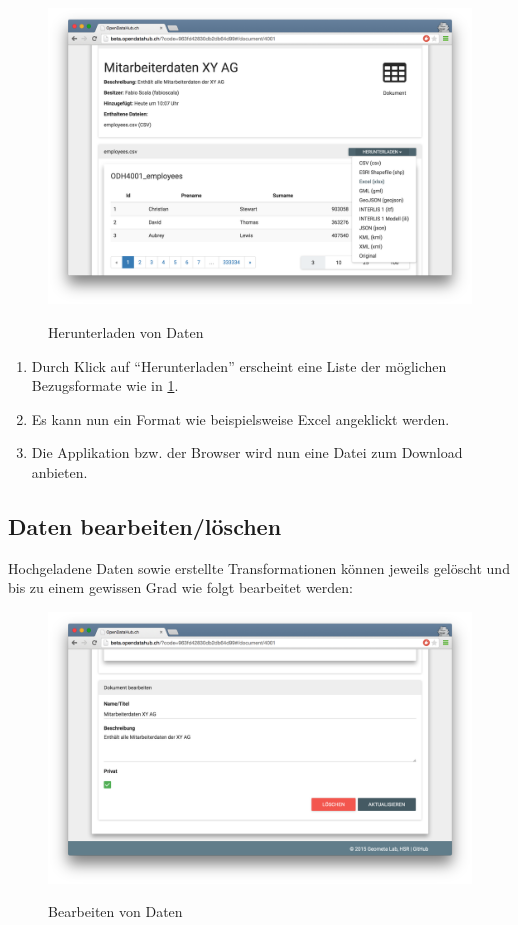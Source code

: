\begin{figure}[H]
	\centering
	\includegraphics[width=\linewidth]{fig/screenshot-daten-herunterladen}
	\label{fig:sd:screenshot-daten-herunterladen}
	\caption{Herunterladen von Daten}
\end{figure}

\begin{enumerate}

\item Durch Klick auf ``Herunterladen'' erscheint eine Liste der möglichen Bezugsformate wie in \cref{fig:sd:screenshot-daten-herunterladen}.
\item Es kann nun ein Format wie beispielsweise Excel angeklickt werden.
\item Die Applikation bzw. der Browser wird nun eine Datei zum Download anbieten.
\end{enumerate}


\subsection{Daten bearbeiten/löschen}

Hochgeladene Daten sowie erstellte Transformationen können jeweils gelöscht und bis zu einem gewissen Grad wie folgt bearbeitet werden:

\begin{figure}[H]
	\centering
	\includegraphics[width=\linewidth]{fig/screenshot-daten-bearbeiten}
	\label{fig:sd:screenshot-daten-bearbeiten}
	\caption{Bearbeiten von Daten}
\end{figure}


